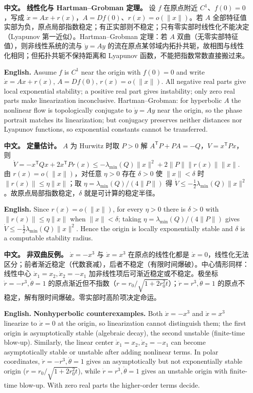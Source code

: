 \documentclass[UTF8,11pt,a4paper]{ctexart}
\newcommand{\APS}[2]{\par\noindent\textbf{中文。} #1\par\noindent\textbf{English.} #2\par}
\newcommand{\norm}[1]{\lVert #1\rVert}\newcommand{\abs}[1]{\lvert #1\rvert}
\begin{document}
\APS{\textbf{线性化与 Hartman--Grobman 定理。} 设 $f$ 在原点附近 $C^1$、$f(0)=0$，写成 $\dot x=Ax+r(x)$，$A=Df(0)$、$r(x)=o(\norm{x})$。若 $A$ 全部特征值实部为负，原点局部指数稳定；有正实部则不稳定；只有零实部时线性化不能决定（Lyapunov 第一近似）。Hartman--Grobman 定理：若 $A$ 双曲（无零实部特征值），则非线性系统的流与 $\dot y=Ay$ 的流在原点某邻域内拓扑共轭，故相图与线性化相同；但拓扑共轭不保持距离和 Lyapunov 函数，不能把指数常数直接搬过来。}{Assume $f$ is $C^1$ near the origin with $f(0)=0$ and write $\dot x=Ax+r(x)$, $A=Df(0)$, $r(x)=o(\norm{x})$. All negative real parts give local exponential stability; a positive real part gives instability; only zero real parts make linearization inconclusive. Hartman--Grobman: for hyperbolic $A$ the nonlinear flow is topologically conjugate to $\dot y=Ay$ near the origin, so the phase portrait matches its linearization; but conjugacy preserves neither distances nor Lyapunov functions, so exponential constants cannot be transferred.}

\APS{\textbf{定量估计。} $A$ 为 Hurwitz 时取 $P>0$ 解 $A^{\mathsf T}P+PA=-Q$，$V=x^{\mathsf T}Px$，则
\[
\dot V=-x^{\mathsf T}Qx+2x^{\mathsf T}Pr(x)
\le-\lambda_{\min}(Q)\norm{x}^2+2\norm{P}\norm{r(x)}\norm{x}.
\]
由 $r(x)=o(\norm{x})$，对任意 $\eta>0$ 存在 $\delta>0$ 使 $\norm{x}<\delta$ 时 $\norm{r(x)}\le\eta\norm{x}$；取 $\eta=\lambda_{\min}(Q)/(4\norm{P})$ 得 $\dot V\le-\frac12\lambda_{\min}(Q)\norm{x}^2$。故原点局部指数稳定，$\delta$ 就是可计算的稳定半径。}{Since $r(x)=o(\norm{x})$, for every $\eta>0$ there is $\delta>0$ with $\norm{r(x)}\le\eta\norm{x}$ when $\norm{x}<\delta$; taking $\eta=\lambda_{\min}(Q)/(4\norm{P})$ gives $\dot V\le-\frac12\lambda_{\min}(Q)\norm{x}^2$. Hence the origin is locally exponentially stable and $\delta$ is a computable stability radius.}

\APS{\textbf{非双曲反例。} $\dot x=-x^3$ 与 $\dot x=x^3$ 在原点的线性化都是 $\dot x=0$，线性化无法区分；前者渐近稳定（代数衰减），后者不稳定（有限时间爆破）。中心情形同样：线性中心 $\dot x_1=x_2,\dot x_2=-x_1$ 加非线性项后可渐近稳定或不稳定。极坐标 $\dot r=-r^3,\dot\theta=1$ 的原点渐近但不指数（$r=r_0/\sqrt{1+2r_0^2t}$）；$\dot r=r^3,\dot\theta=1$ 的原点不稳定，解有限时间爆破。零实部时高阶项决定命运。}{\textbf{Nonhyperbolic counterexamples.} Both $\dot x=-x^3$ and $\dot x=x^3$ linearize to $\dot x=0$ at the origin, so linearization cannot distinguish them; the first origin is asymptotically stable (algebraic decay), the second unstable (finite-time blow-up). Similarly, the linear center $\dot x_1=x_2,\dot x_2=-x_1$ can become asymptotically stable or unstable after adding nonlinear terms. In polar coordinates, $\dot r=-r^3,\dot\theta=1$ gives an asymptotically but not exponentially stable origin ($r=r_0/\sqrt{1+2r_0^2t}$), while $\dot r=r^3,\dot\theta=1$ gives an unstable origin with finite-time blow-up. With zero real parts the higher-order terms decide.}
\end{document}
